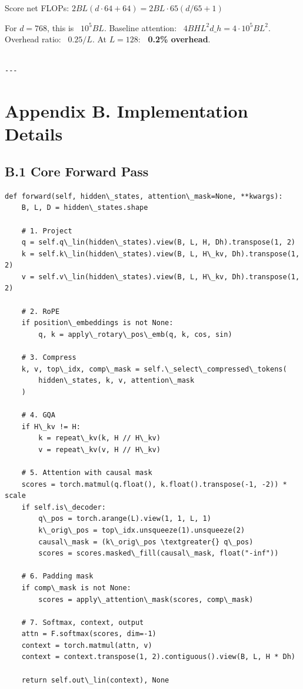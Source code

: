 Score net FLOPs: $2 B L (d \cdot 64 + 64) = 2 B L \cdot 65 (d/65 + 1)$

For $d = 768$, this is ~$10^5 B L$. Baseline attention: ~$4 B H L^2 d\_h = 
4 \cdot 10^5 B L^2$. Overhead ratio: ~$0.25 / L$. At $L = 128$: \textbf{~0.2\% overhead}.
\begin{lstlisting}

---
\end{lstlisting}

\section{Appendix B. Implementation Details}

\subsection{B.1 Core Forward Pass}

\begin{lstlisting}
def forward(self, hidden\_states, attention\_mask=None, **kwargs):
    B, L, D = hidden\_states.shape
    
    # 1. Project
    q = self.q\_lin(hidden\_states).view(B, L, H, Dh).transpose(1, 2)
    k = self.k\_lin(hidden\_states).view(B, L, H\_kv, Dh).transpose(1, 2)
    v = self.v\_lin(hidden\_states).view(B, L, H\_kv, Dh).transpose(1, 2)
    
    # 2. RoPE
    if position\_embeddings is not None:
        q, k = apply\_rotary\_pos\_emb(q, k, cos, sin)
    
    # 3. Compress
    k, v, top\_idx, comp\_mask = self.\_select\_compressed\_tokens(
        hidden\_states, k, v, attention\_mask
    )
    
    # 4. GQA
    if H\_kv != H:
        k = repeat\_kv(k, H // H\_kv)
        v = repeat\_kv(v, H // H\_kv)
    
    # 5. Attention with causal mask
    scores = torch.matmul(q.float(), k.float().transpose(-1, -2)) * scale
    if self.is\_decoder:
        q\_pos = torch.arange(L).view(1, 1, L, 1)
        k\_orig\_pos = top\_idx.unsqueeze(1).unsqueeze(2)
        causal\_mask = (k\_orig\_pos \textgreater{} q\_pos)
        scores = scores.masked\_fill(causal\_mask, float("-inf"))
    
    # 6. Padding mask
    if comp\_mask is not None:
        scores = apply\_attention\_mask(scores, comp\_mask)
    
    # 7. Softmax, context, output
    attn = F.softmax(scores, dim=-1)
    context = torch.matmul(attn, v)
    context = context.transpose(1, 2).contiguous().view(B, L, H * Dh)
    
    return self.out\_lin(context), None
\end{lstlisting}


